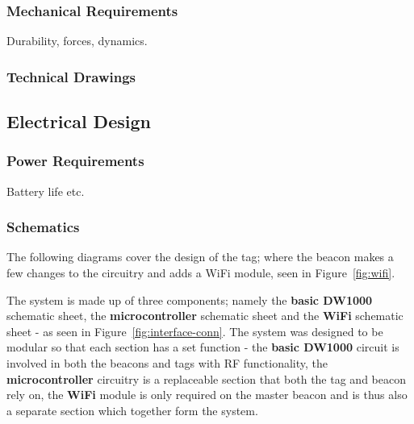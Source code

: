 \subsubsection{Mechanical Requirements}
Durability, forces, dynamics.
\subsubsection{Technical Drawings}
\subsection{Electrical Design} 
\subsubsection{Power Requirements}
Battery life etc.

\newpage
\subsubsection{Schematics}

The following diagrams cover the design of the tag; where the beacon makes a few changes to the circuitry and adds a WiFi module, seen in Figure~\ref{fig:wifi}. 

The system is made up of three components; namely the \textbf{basic DW1000} schematic sheet, the \textbf{microcontroller} schematic sheet and the \textbf{WiFi} schematic sheet - as seen in Figure~\ref{fig:interface-conn}. The system was designed to be modular so that each section has a set function - the \textbf{basic DW1000} circuit is involved in both the beacons and tags with RF functionality, the \textbf{microcontroller} circuitry is a replaceable section that both the tag and beacon rely on, the \textbf{WiFi} module is only required on the master beacon and is thus also a separate section which together form the system.

